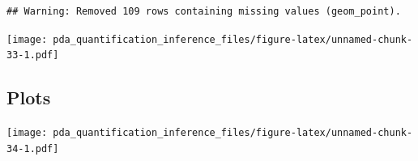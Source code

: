 \documentclass[
]{article}
\newenvironment{Shaded}{\begin{snugshade}}{\end{snugshade}}
\newcommand{\FloatTok}[1]{\textcolor[rgb]{0.00,0.00,0.81}{#1}}
\newcommand{\FunctionTok}[1]{\textcolor[rgb]{0.00,0.00,0.00}{#1}}
\newcommand{\NormalTok}[1]{#1}
\newcommand{\OtherTok}[1]{\textcolor[rgb]{0.56,0.35,0.01}{#1}}
\newcommand{\SpecialCharTok}[1]{\textcolor[rgb]{0.00,0.00,0.00}{#1}}
\newcommand{\StringTok}[1]{\textcolor[rgb]{0.31,0.60,0.02}{#1}}
\begin{document}
\begin{verbatim}
## Warning: Removed 109 rows containing missing values (geom_point).
\end{verbatim}

\texttt{[image: pda\_quantification\_inference\_files/figure-latex/unnamed-chunk-33-1.pdf]}

\hypertarget{plots}{%
\subsection{Plots}\label{plots}}

\begin{Shaded}
\end{Shaded}

\texttt{[image: pda\_quantification\_inference\_files/figure-latex/unnamed-chunk-34-1.pdf]}
\end{document}
